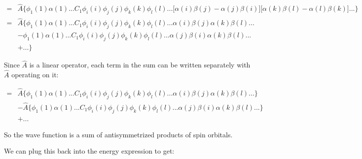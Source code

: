 \documentclass[a4paper]{article}
\begin{document}
\begin{equation}
 \begin{aligned}
     =& \hat{A} \{ \phi_1(1)\alpha(1)... C_1\phi_i(i) \phi_j(j) \phi_k(k) \phi_l(l)... \big[\alpha(i)\beta(j)-\alpha(j)\beta(i) \big] \big[\alpha(k)\beta(l)-\alpha(l)\beta(k) \big]... \} \\
     =& \hat{A} \{ \phi_1(1)\alpha(1)... C_1\phi_i(i) \phi_j(j) \phi_k(k) \phi_l(l)... \alpha(i)\beta(j) \alpha(k)\beta(l)... \\
     &- \phi_1(1)\alpha(1)... C_1\phi_i(i) \phi_j(j) \phi_k(k) \phi_l(l)...\alpha(j)\beta(i) \alpha(k)\beta(l)... \\
     &+...
     \}
     \end{aligned}
     \end{equation}

Since $\hat{A}$ is a linear operator, each term in the sum can be written separately with $\hat{A}$ operating on it:

\begin{equation}
 \begin{aligned}
     =& \hat{A} \{ \phi_1(1)\alpha(1)... C_1\phi_i(i) \phi_j(j) \phi_k(k) \phi_l(l)... \alpha(i)\beta(j) \alpha(k)\beta(l)... \} \\
     &- \hat{A} \{ \phi_1(1)\alpha(1)... C_1\phi_i(i) \phi_j(j) \phi_k(k) \phi_l(l)...\alpha(j)\beta(i) \alpha(k)\beta(l)... \} \\
     &+...
     \end{aligned}
     \end{equation}

So the wave function is a sum of antisymmetrized products of spin orbitals.

We can plug this back into the energy expression to get:
\end{document}
